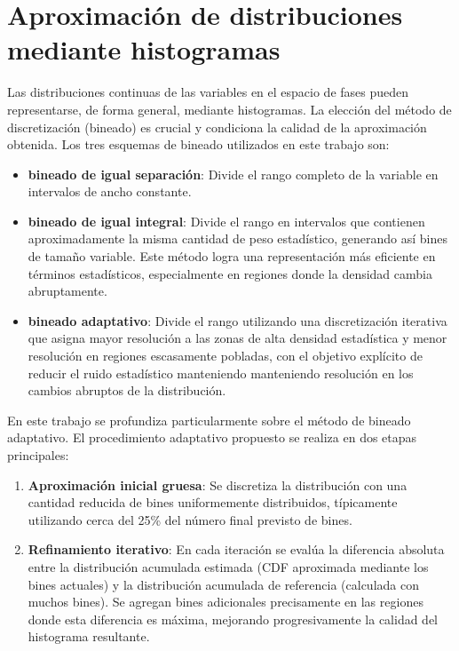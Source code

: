 \section{Aproximación de distribuciones mediante histogramas}

Las distribuciones continuas de las variables en el espacio de fases pueden representarse, de forma general, mediante histogramas. La elección del método de discretización (bineado) es crucial y condiciona la calidad de la aproximación obtenida. Los tres esquemas de bineado utilizados en este trabajo son:

\begin{itemize}
    \item \textbf{bineado de igual separación}: Divide el rango completo de la variable en intervalos de ancho constante. 

    \item \textbf{bineado de igual integral}: Divide el rango en intervalos que contienen aproximadamente la misma cantidad de peso estadístico, generando así bines de tamaño variable. Este método logra una representación más eficiente en términos estadísticos, especialmente en regiones donde la densidad cambia abruptamente.

    \item \textbf{bineado adaptativo}: Divide el rango utilizando una discretización iterativa que asigna mayor resolución a las zonas de alta densidad estadística y menor resolución en regiones escasamente pobladas, con el objetivo explícito de reducir el ruido estadístico manteniendo manteniendo resolución en los cambios abruptos de la distribución.
\end{itemize}

En este trabajo se profundiza particularmente sobre el método de bineado adaptativo. El procedimiento adaptativo propuesto se realiza en dos etapas principales:

\begin{enumerate}
    \item \textbf{Aproximación inicial gruesa}: Se discretiza la distribución con una cantidad reducida de bines uniformemente distribuidos, típicamente utilizando cerca del 25\% del número final previsto de bines.
    
    \item \textbf{Refinamiento iterativo}: En cada iteración se evalúa la diferencia absoluta entre la distribución acumulada estimada (CDF aproximada mediante los bines actuales) y la distribución acumulada de referencia (calculada con muchos bines). Se agregan bines adicionales precisamente en las regiones donde esta diferencia es máxima, mejorando progresivamente la calidad del histograma resultante.
\end{enumerate}

